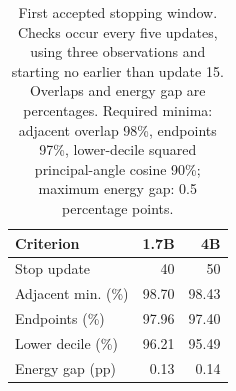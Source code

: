 \begin{table}[t]
\centering
\caption{First accepted stopping window. Checks occur every five updates, using three observations and starting no earlier than update 15. Overlaps and energy gap are percentages. Required minima: adjacent overlap 98\%, endpoints 97\%, lower-decile squared principal-angle cosine 90\%; maximum energy gap: 0.5 percentage points.}
\label{tab:stopping}
\small
\setlength{\tabcolsep}{3pt}
\begin{tabular}{lrr}
\toprule
Criterion & 1.7B & 4B \\
\midrule
Stop update & 40 & 50 \\
Adjacent min. (\%) & 98.70 & 98.43 \\
Endpoints (\%) & 97.96 & 97.40 \\
Lower decile (\%) & 96.21 & 95.49 \\
Energy gap (pp) & 0.13 & 0.14 \\
\bottomrule
\end{tabular}
\end{table}
